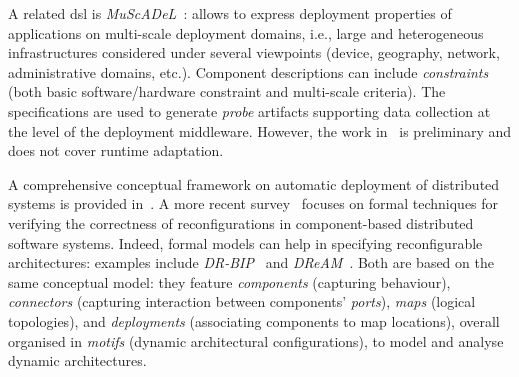 \documentclass[conference]{IEEEtran}
\newcommand{\meta}[1]{{\color{blue}#1}}
\begin{document}
A related \ac{dsl} is 
\emph{MuScADeL}~\cite{DBLP:conf/compsac/BoujbelRLTAL14/muscadel}: allows to express deployment properties of 
applications on multi-scale deployment domains,
i.e., large and heterogeneous infrastructures considered under several viewpoints
(device, geography, network, administrative domains, etc.).
%
Component descriptions can include \emph{constraints} (both basic software/hardware constraint and multi-scale criteria).
%
The specifications are used to generate \emph{probe} artifacts supporting data collection at the level of the deployment middleware.
%
However, the work in~\cite{DBLP:conf/compsac/BoujbelRLTAL14/muscadel} is preliminary and does not cover runtime adaptation.
 

%
A comprehensive conceptual framework
 on automatic deployment of distributed systems
 is provided in~\cite{DBLP:journals/jss/ArcangeliBL15}.
%
A more recent survey~\cite{coullon2023swreconfig} focuses
 on formal techniques for verifying the correctness of reconfigurations
 in component-based distributed software systems.
%
Indeed, formal models can help in specifying reconfigurable architectures: examples include 
\emph{DR-BIP}~\cite{Ballouli18dr-bip}
and \emph{DReAM}~\cite{denicola2020dream-dynamic-reconfig-arch-modelling}.
%
Both are based on the same conceptual model: they 
 feature \emph{components} (capturing behaviour),
\emph{connectors} (capturing interaction between components' \emph{ports}),
\emph{maps} (logical topologies),
and \emph{deployments} (associating components to map locations),
overall organised in \emph{motifs} (dynamic architectural configurations),
to model and analyse dynamic architectures.
%
\end{document}
